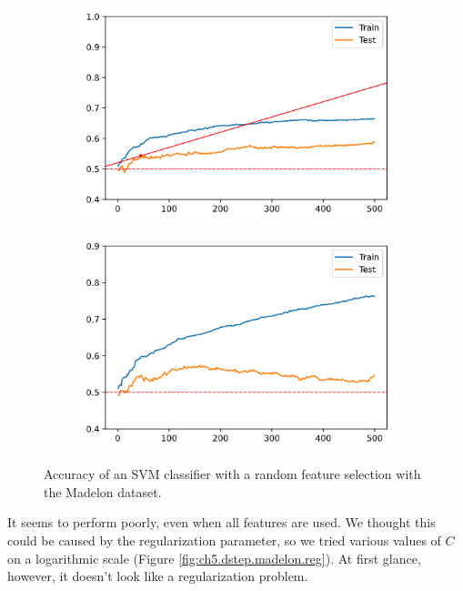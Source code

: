 \begin{figure}[H]
    \centering
    \begin{subfigure}[b]{0.4\linewidth}
        \includegraphics[width=\linewidth]{img/ch5/dstep/madelon-random.png}
    \end{subfigure}
    \begin{subfigure}[b]{0.4\linewidth}
        \includegraphics[width=\linewidth]{img/ch5/madelon-random-c_1}
    \end{subfigure}
    \caption[Madelon with random selection]{Accuracy of an SVM classifier with a random feature selection with the Madelon dataset.}
    \label{fig:ch5.dstep.madelon.rand}
\end{figure}

It seems to perform poorly, even when all features are used. We thought this could be caused by the regularization parameter, so we tried various values of $C$ on a logarithmic scale (Figure \ref{fig:ch5.dstep.madelon.reg}). At first glance, however, it doesn't look like a regularization problem.


